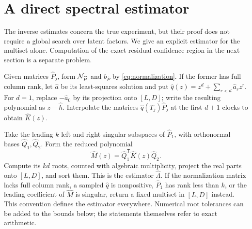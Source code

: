 \section{A direct spectral estimator}
\label{sec:algorithm}
The inverse estimates concern the true experiment, but their proof
does not require a global search over latent factors. We give an
explicit estimator for the multiset alone. Computation of the exact
residual confidence region in the next section is a separate problem.

Given matrices $\widehat P_j$, form $\mathcal N_{\widehat P}$ and
$b_{\widehat P}$ by \eqref{eq:normalization}. If the former has full
column rank, let $\widehat a$ be its least-squares solution and put
$\widehat q(z)=z^d+\sum_{r<d}\widehat a_rz^r$.
For $d=1$, replace $-\widehat a_0$ by its projection onto $[L,D]$;
write the resulting polynomial as $z-\widehat h$.
Interpolate the matrices $\widehat q(T_j)\widehat P_j$ at the first
$d+1$ clocks to obtain $\widehat K(z)$.

Take the leading $k$ left and right singular subspaces of
$\widehat P_1$, with orthonormal bases $\widehat Q_1,\widehat Q_2$.
Form the reduced polynomial
\[
 \widehat M(z)=\widehat Q_1^{\mathsf T}\widehat K(z)\widehat Q_2.
\]
Compute its $kd$ roots, counted with algebraic multiplicity, project
the real parts onto $[L,D]$, and sort them. This is the estimator
$\widehat\Lambda$. If the normalization matrix lacks full column
rank, a sampled $\widehat q$ is nonpositive, $\widehat P_1$ has rank
less than $k$, or the leading coefficient of $\widehat M$ is singular,
return a fixed multiset in $[L,D]$ instead. This convention defines the
estimator everywhere. Numerical root tolerances can be added to the
bounds below; the statements themselves refer to exact arithmetic.

